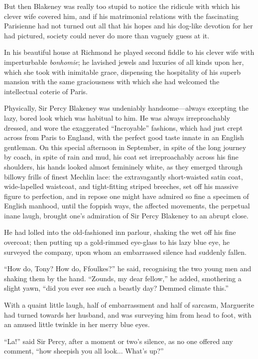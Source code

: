\documentclass[paper=5.5in:8.5in,BCOR=7mm,twoside,DIV=calc,12pt,usegeometry,chapterprefix,endperiod,headings=big]{scrbook}
\begin{document}
But then Blakeney was really too stupid to notice the ridicule with which his clever wife covered him, and if his matrimonial relations with the fascinating Parisienne had not turned out all that his hopes and his dog-like devotion for her had pictured, society could never do more than vaguely guess at it.

In his beautiful house at Richmond he played second fiddle to his clever wife with imperturbable \textit{bonhomie}; he lavished jewels and luxuries of all kinds upon her, which she took with inimitable grace, dispensing the hospitality of his superb mansion with the same graciousness with which she had welcomed the intellectual coterie of Paris.

Physically, Sir Percy Blakeney was undeniably \newline handsome---always excepting the lazy, bored look which was habitual to him. He was always irreproachably dressed, and wore the exaggerated \enquote{Incroyable} fashions, which had just crept across from Paris to England, with the perfect good taste innate in an English gentleman. On this special afternoon in September, in spite of the long journey by coach, in spite of rain and mud, his coat set irreproachably across his fine shoulders, his hands looked almost femininely white, as they emerged through billowy frills of finest Mechlin lace: the extravagantly short-waisted satin coat, wide-lapelled waistcoat, and tight-fitting striped breeches, set off his massive figure to perfection, and in repose one might have admired so fine a specimen of English manhood, until the foppish ways, the affected movements, the perpetual inane laugh, brought one's admiration of Sir Percy Blakeney to an abrupt close.

He had lolled into the old-fashioned inn parlour, shaking the wet off his fine overcoat; then putting up a gold-rimmed eye-glass to his lazy blue eye, he surveyed the company, upon whom an embarrassed silence had suddenly fallen.

\enquote{How do, Tony? How do, Ffoulkes?} he said, recognising the two young men and shaking them by the hand. \enquote{Zounds, my dear fellow,} he added, smothering a slight yawn, \enquote{did you ever see such a beastly day? Demmed climate this.}

With a quaint little laugh, half of embarrassment and half of sarcasm, Marguerite had turned towards her husband, and was surveying him from head to foot, with an amused little twinkle in her merry blue eyes.

\enquote{La!} said Sir Percy, after a moment or two's silence, as no one offered any comment, \enquote{how sheepish you all look... What's up?}
\end{document}
